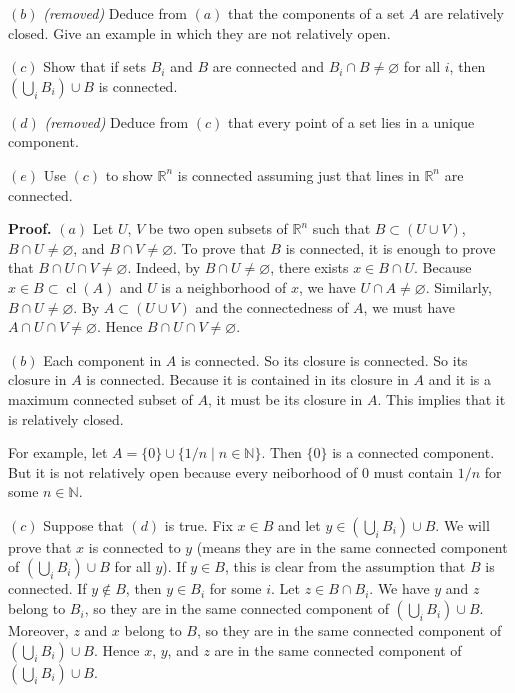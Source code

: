 \documentclass{article}
\begin{document}
$(b)$ \emph{(removed)} Deduce from $(a)$ that the components of a set
$A$ are relatively closed. Give an example in which they are not
relatively open.

$(c)$ Show that if sets $B_i$ and $B$ are connected and
$B_i\cap B\neq \varnothing$ for all $i$, then $(\bigcup_i B_i)\cup B$ is
connected.

$(d)$ \emph{(removed)} Deduce from $(c)$ that every point of a set lies
in a unique component.

$(e)$ Use $(c)$ to show $\mathbb{R}^n$ is connected assuming just that
lines in $\mathbb{R}^n$ are connected.

\textbf{Proof.} $(a)$ Let $U$, $V$ be two open subsets of $\mathbb{R}^n$
such that $B \subset (U\cup V)$, $B \cap U \ne\varnothing$, and
$B \cap V \ne \varnothing$. To prove that $B$ is connected, it is enough
to prove that $B \cap U \cap V \ne \varnothing$. Indeed, by
$B \cap U \ne\varnothing$, there exists $x\in B \cap U$. Because
$x\in B \subset \operatorname{cl}(A)$ and $U$ is a neighborhood of $x$,
we have $U \cap A \ne \varnothing$. Similarly,
$B \cap U \ne\varnothing$. By $A \subset (U\cup V)$ and the
connectedness of $A$, we must have $A\cap U \cap V \ne \varnothing$.
Hence $B \cap U \cap V \ne \varnothing$.

$(b)$ Each component in $A$ is connected. So its closure is connected.
So its closure in $A$ is connected. Because it is contained in its
closure in $A$ and it is a maximum connected subset of $A$, it must be
its closure in $A$. This implies that it is relatively closed.

For example, let $A= \{0\}\cup \{1/n\mid n\in \mathbb{N}\}$. Then
$\{0\}$ is a connected component. But it is not relatively open because
every neiborhood of $0$ must contain $1/n$ for some $n\in\mathbb{N}$.

$(c)$ Suppose that $(d)$ is true. Fix $x \in B$ and let
$y \in (\bigcup_i B_i)\cup B$. We will prove that $x$ is connected to
$y$ (means they are in the same connected component of
$(\bigcup_i B_i)\cup B$ for all $y$). If $y \in B$, this is clear from
the assumption that $B$ is connected. If $y\notin B$, then $y \in B_i$
for some $i$. Let $z \in B \cap B_i$. We have $y$ and $z$ belong to
$B_i$, so they are in the same connected component of
$(\bigcup_i B_i)\cup B$. Moreover, $z$ and $x$ belong to $B$, so they
are in the same connected component of $(\bigcup_i B_i)\cup B$. Hence
$x$, $y$, and $z$ are in the same connected component of
$(\bigcup_i B_i)\cup B$.
\end{document}
